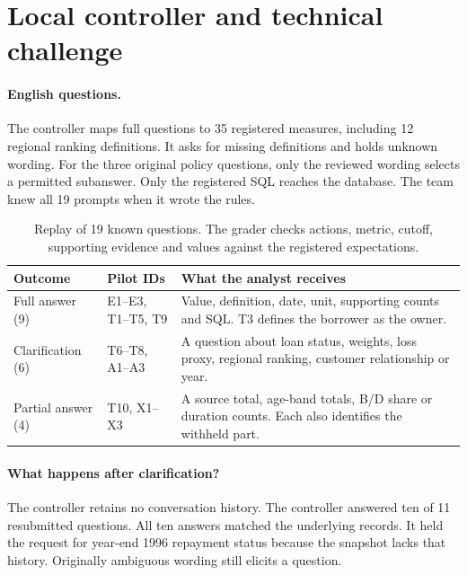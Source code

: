 \section{Local controller and technical challenge}
\label{sec:controller}

\paragraph{English questions.}
The controller maps full questions to 35 registered measures, including 12 regional ranking definitions. It asks for missing definitions and holds unknown wording. For the three original policy questions, only the reviewed wording selects a permitted subanswer. Only the registered SQL reaches the database. The team knew all 19 prompts when it wrote the rules.

\begin{table}[H]
\centering\small\renewcommand{\arraystretch}{1.16}
\begin{tabularx}{\linewidth}{@{}p{.18\linewidth}p{.23\linewidth}X@{}}
\toprule
\textbf{Outcome} & \textbf{Pilot IDs} & \textbf{What the analyst receives}\\\midrule
Full answer (9) & E1--E3, T1--T5, T9 & Value, definition, date, unit, supporting counts and SQL. T3 defines the borrower as the owner.\\
Clarification (6) & T6--T8, A1--A3 & A question about loan status, weights, loss proxy, regional ranking, customer relationship or year.\\
Partial answer (4) & T10, X1--X3 & A source total, age-band totals, B/D share or duration counts. Each also identifies the withheld part.\\
\bottomrule
\end{tabularx}
\caption{Replay of 19 known questions. The grader checks actions, metric, cutoff, supporting evidence and values against the registered expectations.}
\end{table}

\paragraph{What happens after clarification?}
The controller retains no conversation history. The controller answered ten of 11 resubmitted questions. All ten answers matched the underlying records. It held the request for year-end 1996 repayment status because the snapshot lacks that history. Originally ambiguous wording still elicits a question.

